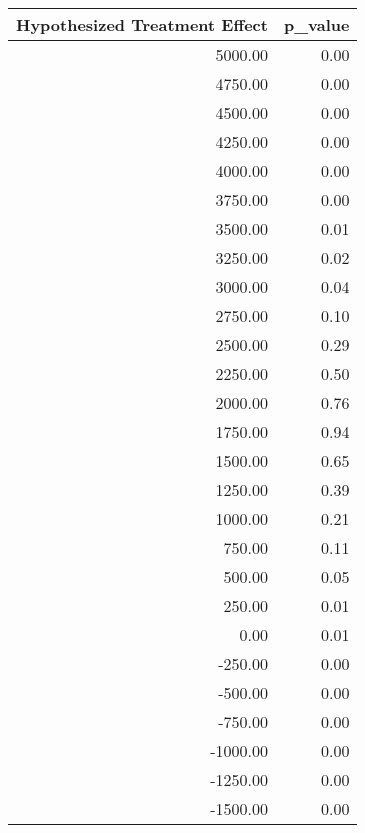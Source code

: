 \begin{tabular}{rr}
  \hline
Hypothesized Treatment Effect & p\_value \\ 
  \hline
5000.00 & 0.00 \\ 
  4750.00 & 0.00 \\ 
  4500.00 & 0.00 \\ 
  4250.00 & 0.00 \\ 
  4000.00 & 0.00 \\ 
  3750.00 & 0.00 \\ 
  3500.00 & 0.01 \\ 
  3250.00 & 0.02 \\ 
  3000.00 & 0.04 \\ 
  2750.00 & 0.10 \\ 
  2500.00 & 0.29 \\ 
  2250.00 & 0.50 \\ 
  2000.00 & 0.76 \\ 
  1750.00 & 0.94 \\ 
  1500.00 & 0.65 \\ 
  1250.00 & 0.39 \\ 
  1000.00 & 0.21 \\ 
  750.00 & 0.11 \\ 
  500.00 & 0.05 \\ 
  250.00 & 0.01 \\ 
  0.00 & 0.01 \\ 
  -250.00 & 0.00 \\ 
  -500.00 & 0.00 \\ 
  -750.00 & 0.00 \\ 
  -1000.00 & 0.00 \\ 
  -1250.00 & 0.00 \\ 
  -1500.00 & 0.00 \\ 
   \hline
\end{tabular}
